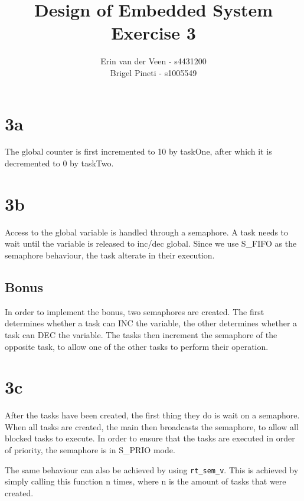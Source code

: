 \documentclass{scrartcl}
\title{Design of Embedded System\\Exercise 3}
\author{Erin van der Veen - s4431200\\
	Brigel Pineti - s1005549}
\begin{document}
\maketitle

\section*{3a}
The global counter is first incremented to 10 by taskOne, after which it is decremented to 0 by taskTwo.

\section*{3b}
Access to the global variable is handled through a semaphore.
A task needs to wait until the variable is released to inc/dec global.
Since we use S\_FIFO as the semaphore behaviour, the task alterate in their execution.

\subsection*{Bonus}
In order to implement the bonus, two semaphores are created.
The first determines whether a task can INC the variable, the other determines whether a task can DEC the variable.
The tasks then increment the semaphore of the opposite task, to allow one of the other tasks to perform their operation.

\section*{3c}
After the tasks have been created, the first thing they do is wait on a semaphore.
When all tasks are created, the main then broadcasts the semaphore, to allow all blocked tasks to execute.
In order to ensure that the tasks are executed in order of priority, the semaphore is in S\_PRIO mode.

The same behaviour can also be achieved by using \lstinline|rt_sem_v|.
This is achieved by simply calling this function n times, where n is the amount of tasks that were created.
\end{document}
